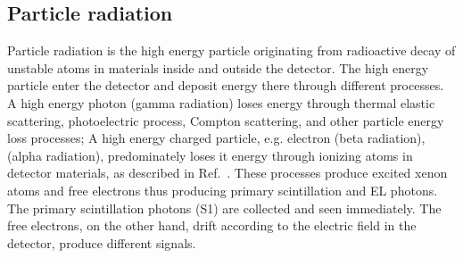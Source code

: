 \subsection{Particle radiation}
\label{sec:events particle}
Particle radiation is the high energy particle originating from radioactive decay of unstable atoms in materials inside and outside the detector. The high energy particle enter the detector and deposit energy there through different processes. A high energy photon (gamma radiation) loses energy through thermal elastic scattering, photoelectric process, Compton scattering, and other particle energy loss processes; A high energy charged particle, e.g. electron (beta radiation),  (alpha radiation), predominately loses it energy through ionizing atoms in detector materials, as described in Ref.~\cite{Blum2008}.  These processes produce excited xenon atoms and free electrons thus producing primary scintillation and EL photons. The primary scintillation photons (S1) are collected and seen immediately. The free electrons, on the other hand, drift according to the electric field in the detector, produce different signals. 

